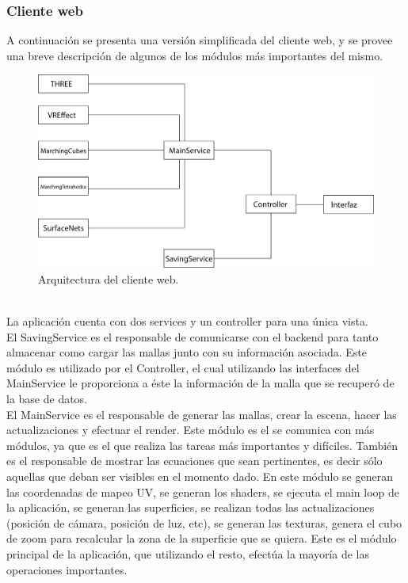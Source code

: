 \documentclass[12pt]{article}
\begin{document}
\subsubsection{Cliente web}
A continuación se presenta una versión simplificada del cliente web, y se provee una breve descripción de algunos de los módulos más importantes del mismo.\\
\begin{figure}[h]
\includegraphics[width=\textwidth]{arq_sim.png}
\caption{Arquitectura del cliente web.}
\end{figure}
\\La aplicación cuenta con dos services y un controller para una única vista. 
\\El SavingService es el responsable de comunicarse con el backend para tanto almacenar como cargar las mallas junto con su información asociada. Este módulo es utilizado por el Controller, el cual utilizando las interfaces del MainService le proporciona a éste la información de la malla que se recuperó de la base de datos.
\\El MainService es el responsable de generar las mallas, crear la escena, hacer las actualizaciones y efectuar el render. Este módulo es el se comunica con más módulos, ya que es el que realiza las tareas más importantes y difíciles. También es el responsable de mostrar las ecuaciones que sean pertinentes, es decir sólo aquellas que deban ser visibles en el momento dado. En este módulo se generan las coordenadas de mapeo UV, se generan los shaders, se ejecuta el main loop de la aplicación, se generan las superficies, se realizan todas las actualizaciones (posición de cámara, posición de luz, etc), se generan las texturas, genera el cubo de zoom para recalcular la zona de la superficie que se quiera. Este es el módulo principal de la aplicación, que utilizando el resto, efectúa la mayoría de las operaciones importantes.
\end{document}
